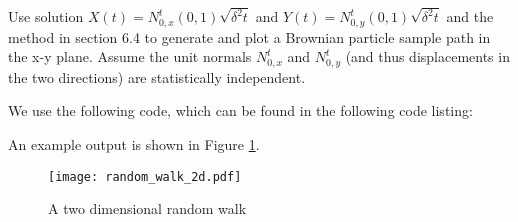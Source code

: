 

Use solution $X(t) = N^t_{0,x}(0,1)\sqrt{\delta^2 t}$ and $Y(t) = N^t_{0,y}(0,1)\sqrt{\delta^2 t}$ and the method in section 6.4 to generate and plot a Brownian particle sample path in the x-y plane.
Assume the unit normals $N^t_{0,x}$ and $N^t_{0,y}$ (and thus displacements in the two directions) are statistically independent.


We use the following code, which can be found in the following code listing:



An example output is shown in Figure \ref{Fig:ch6.problem4.2drandomwalk}.

\begin{figure}
  \begin{centering}
  \texttt{[image: random\_walk\_2d.pdf]}
  \par\end{centering}
  \caption{A two dimensional random walk}
  \label{Fig:ch6.problem4.2drandomwalk}
\end{figure}
